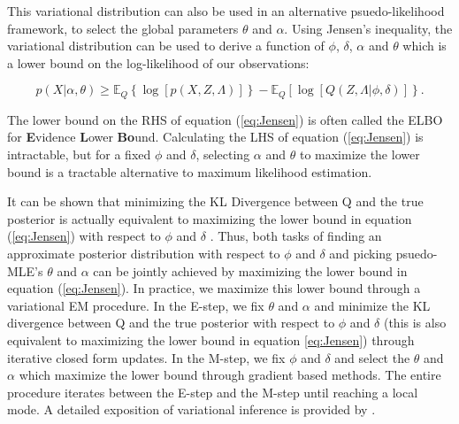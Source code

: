 \documentclass{article}\usepackage[]{graphicx}\usepackage[]{color}
\newcommand{\E}{\mathbb{E}}
\begin{document}
This variational distribution can also be used in an alternative psuedo-likelihood framework, to select the global parameters $\theta$ and $\alpha$. Using Jensen's inequality, the variational distribution can be used to derive a function of $\phi$, $\delta$, $\alpha$ and $\theta$ which is a lower bound on the log-likelihood of our observations:

\begin{equation}\label{eq:Jensen}
p(X|\alpha, \theta) \geq \E_Q\left\{\log\left[p(X,Z, \Lambda)\right]\right\} - \E_Q\left[\log\left[Q(Z, \Lambda|\phi, \delta)\right]\right\}.
\end{equation}

The lower bound on the RHS of equation (\ref{eq:Jensen}) is often called the ELBO for \textbf{E}vidence \textbf{L}ower \textbf{Bo}und. Calculating the LHS of equation (\ref{eq:Jensen}) is intractable, but for a fixed $\phi$ and $\delta$, selecting $\alpha$ and $\theta$ to maximize the lower bound is a tractable alternative to maximum likelihood estimation. 

It can be shown that minimizing the KL Divergence between Q and the true posterior is actually equivalent to maximizing the lower bound in equation (\ref{eq:Jensen}) with respect to $\phi$ and $\delta$ \citep{beal2003variational}. Thus, both tasks of finding an approximate posterior distribution with respect to $\phi$ and $\delta$ and picking psuedo-MLE's $\theta$ and $\alpha$ can be jointly achieved by maximizing the lower bound in equation (\ref{eq:Jensen}). In practice, we maximize this lower bound through a variational EM procedure. In the E-step, we fix $\theta$ and $\alpha$ and minimize the KL divergence between Q and the true posterior with respect to $\phi$ and $\delta$  (this is also equivalent to maximizing the lower bound in equation \ref{eq:Jensen}) through iterative closed form updates. In the M-step, we fix $\phi$ and $\delta$ and select the $\theta$ and $\alpha$ which maximize the lower bound through gradient based methods. The entire procedure iterates between the E-step and the M-step until reaching a local mode. A detailed exposition of variational inference is provided by \cite{jaakkola200110}.
\end{document}
